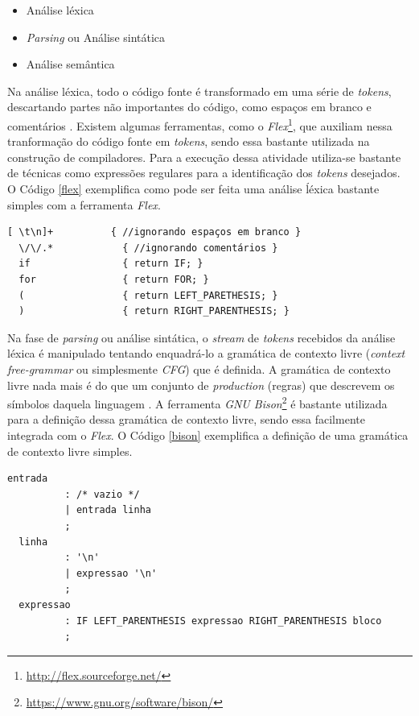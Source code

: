\begin{itemize}
\item Análise léxica
\item \textit{Parsing} ou Análise sintática
\item Análise semântica
\end{itemize}

Na análise léxica, todo o código fonte é transformado em uma série de
\textit{tokens}, descartando partes não importantes do código, como espaços em
branco e comentários \cite{chess&west2007}. Existem algumas ferramentas, como o
\textit{Flex}\footnote{\url{http://flex.sourceforge.net/}}, que auxiliam nessa
tranformação do código fonte em \textit{tokens}, sendo essa bastante utilizada
na construção de compiladores. Para a execução dessa atividade utiliza-se
bastante de técnicas como expressões regulares para a identificação dos
\textit{tokens} desejados. O Código \ref{flex} exemplifica como pode ser feita uma
análise ĺéxica bastante simples com a ferramenta \textit{Flex}.

\begin{lstlisting}[caption={Análise léxica simples com a ferramenta \textit{Flex}}, label=flex]
  [ \t\n]+          { //ignorando espaços em branco }
  \/\/.*            { //ignorando comentários }
  if                { return IF; }
  for               { return FOR; }
  (                 { return LEFT_PARETHESIS; }
  )                 { return RIGHT_PARENTHESIS; }
\end{lstlisting}

Na fase de \textit{parsing} ou análise sintática, o \textit{stream} de
\textit{tokens} recebidos da análise léxica é manipulado tentando enquadrá-lo a
gramática de contexto livre (\textit{context free-grammar} ou simplesmente
\textit{CFG}) que é definida. A gramática de contexto livre nada mais é do que
um conjunto de \textit{production} (regras) que descrevem os símbolos daquela
linguagem \cite{chess&west2007}. A ferramenta
\textit{GNU Bison}\footnote{\url{https://www.gnu.org/software/bison/}} é
bastante utilizada para a definição dessa gramática de contexto livre, sendo
essa facilmente integrada com o \textit{Flex}. O Código \ref{bison} exemplifica
a definição de uma gramática de contexto livre simples.

\begin{lstlisting}[caption={Definição de uma \textit{CFG} simples com a ferramenta
\textit{GNU Bison}}, label=bison]
  entrada    
          : /* vazio */
          | entrada linha
          ;
  linha     
          : '\n'
          | expressao '\n'
          ;
  expressao
          : IF LEFT_PARENTHESIS expressao RIGHT_PARENTHESIS bloco
          ;
\end{lstlisting}

